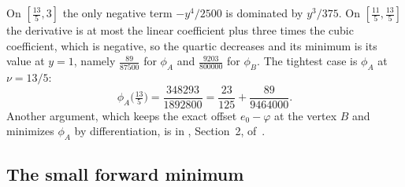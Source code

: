 On $[\frac{13}5,3]$ the only negative term $-y^4/2500$ is dominated by $y^3/375$. On
$[\frac{11}5,\frac{13}5]$ the derivative is at most the linear coefficient plus three times the
cubic coefficient, which is negative, so the quartic decreases and its minimum is its value at
$y=1$, namely $\frac{89}{87500}$ for $\phi_A$ and $\frac{9203}{800000}$ for $\phi_B$. The tightest
case is $\phi_A$ at $\nu=13/5$:
\[
\phi_A\bigl(\tfrac{13}5\bigr)=\frac{348293}{1892800}=\frac{23}{125}+\frac{89}{9464000}.
\]
Another argument, which keeps the exact offset $e_0-\varphi$ at the vertex $B$ and minimizes
$\phi_A$ by differentiation, is in , Section~2,
of~\cite{Notes}.

\subsection{The small forward minimum}\label{app:fwd-small}

